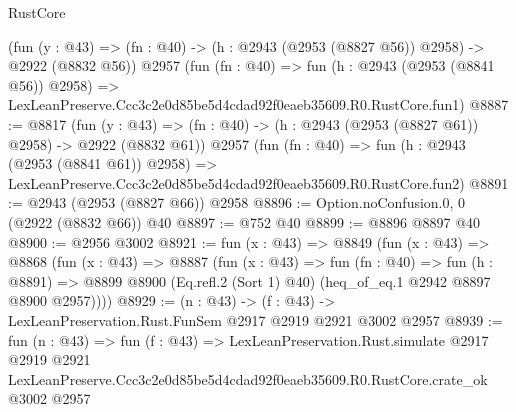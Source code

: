 \begin{lexlean}{RustCore}
\begin{coremodule}
    (fun (y : @43) => (fn : @40) -> (h : @2943 (@2953 (@8827 @56)) @2958) -> @2922 (@8832 @56))
    @2957
    (fun (fn : @40) =>
    fun (h : @2943 (@2953 (@8841 @56)) @2958) =>
    LexLeanPreserve.Ccc3c2e0d85be5d4cdad92f0eaeb35609.R0.RustCore.fun1)
@8887 := @8817
    (fun (y : @43) => (fn : @40) -> (h : @2943 (@2953 (@8827 @61)) @2958) -> @2922 (@8832 @61))
    @2957
    (fun (fn : @40) =>
    fun (h : @2943 (@2953 (@8841 @61)) @2958) =>
    LexLeanPreserve.Ccc3c2e0d85be5d4cdad92f0eaeb35609.R0.RustCore.fun2)
@8891 := @2943 (@2953 (@8827 @66)) @2958
@8896 := Option.noConfusion.{0, 0} (@2922 (@8832 @66)) @40
@8897 := @752 @40
@8899 := @8896 @8897 @40
@8900 := @2956 @3002
@8921 := fun (x : @43) =>
  @8849
    (fun (x : @43) =>
    @8868
      (fun (x : @43) =>
      @8887
        (fun (x : @43) =>
        fun (fn : @40) =>
        fun (h : @8891) =>
        @8899 @8900 (Eq.refl.{2} (Sort 1) @40) (heq_of_eq.{1} @2942 @8897 @8900 @2957))))
@8929 := (n : @43) -> (f : @43) -> LexLeanPreservation.Rust.FunSem @2917 @2919 @2921 @3002 @2957
@8939 := fun (n : @43) =>
  fun (f : @43) =>
  LexLeanPreservation.Rust.simulate
    @2917
    @2919
    @2921
    LexLeanPreserve.Ccc3c2e0d85be5d4cdad92f0eaeb35609.R0.RustCore.crate_ok
    @3002
    @2957
\end{coremodule}
\end{lexlean}
